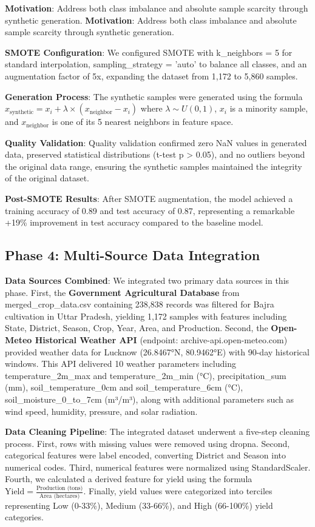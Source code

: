 \documentclass[10pt,twocolumn]{article}
\begin{document}
\textbf{Motivation}: Address both class imbalance and absolute sample scarcity through synthetic generation.
\textbf{Motivation}: Address both class imbalance and absolute sample scarcity through synthetic generation.

\textbf{SMOTE Configuration}: We configured SMOTE with k\_neighbors = 5 for standard interpolation, sampling\_strategy = 'auto' to balance all classes, and an augmentation factor of 5x, expanding the dataset from 1,172 to 5,860 samples.

\textbf{Generation Process}: The synthetic samples were generated using the formula $x_{\text{synthetic}} = x_i + \lambda \times (x_{\text{neighbor}} - x_i)$ where $\lambda \sim U(0,1)$, $x_i$ is a minority sample, and $x_{\text{neighbor}}$ is one of its 5 nearest neighbors in feature space.

\textbf{Quality Validation}: Quality validation confirmed zero NaN values in generated data, preserved statistical distributions (t-test p > 0.05), and no outliers beyond the original data range, ensuring the synthetic samples maintained the integrity of the original dataset.

\textbf{Post-SMOTE Results}: After SMOTE augmentation, the model achieved a training accuracy of 0.89 and test accuracy of 0.87, representing a remarkable +19\% improvement in test accuracy compared to the baseline model.

\subsection{Phase 4: Multi-Source Data Integration}

\textbf{Data Sources Combined}: We integrated two primary data sources in this phase. First, the \textbf{Government Agricultural Database} from merged\_crop\_data.csv containing 238,838 records was filtered for Bajra cultivation in Uttar Pradesh, yielding 1,172 samples with features including State, District, Season, Crop, Year, Area, and Production. Second, the \textbf{Open-Meteo Historical Weather API} (endpoint: archive-api.open-meteo.com) provided weather data for Lucknow (26.8467°N, 80.9462°E) with 90-day historical windows. This API delivered 10 weather parameters including temperature\_2m\_max and temperature\_2m\_min (°C), precipitation\_sum (mm), soil\_temperature\_0cm and soil\_temperature\_6cm (°C), soil\_moisture\_0\_to\_7cm (m³/m³), along with additional parameters such as wind speed, humidity, pressure, and solar radiation.

\textbf{Data Cleaning Pipeline}: The integrated dataset underwent a five-step cleaning process. First, rows with missing values were removed using dropna. Second, categorical features were label encoded, converting District and Season into numerical codes. Third, numerical features were normalized using StandardScaler. Fourth, we calculated a derived feature for yield using the formula $\text{Yield} = \frac{\text{Production (tons)}}{\text{Area (hectares)}}$. Finally, yield values were categorized into terciles representing Low (0-33\%), Medium (33-66\%), and High (66-100\%) yield categories.
\end{document}
